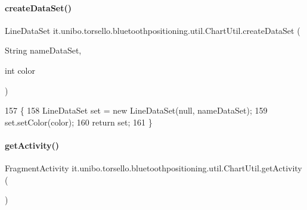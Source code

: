 \paragraph{\texorpdfstring{create\+Data\+Set()}{createDataSet()}\hspace{0.1cm}{\footnotesize\ttfamily [2/2]}}
{\footnotesize\ttfamily Line\+Data\+Set it.\+unibo.\+torsello.\+bluetoothpositioning.\+util.\+Chart\+Util.\+create\+Data\+Set (\begin{DoxyParamCaption}\item[{String}]{name\+Data\+Set,  }\item[{int}]{color }\end{DoxyParamCaption})\hspace{0.3cm}{\ttfamily [private]}}


\begin{DoxyCode}
157                                                                      \{
158         LineDataSet \textcolor{keyword}{set} = \textcolor{keyword}{new} LineDataSet(null, nameDataSet);
159         \textcolor{keyword}{set}.setColor(color);
160         \textcolor{keywordflow}{return} \textcolor{keyword}{set};
161     \}
\end{DoxyCode}
\hypertarget{classit_1_1unibo_1_1torsello_1_1bluetoothpositioning_1_1util_1_1ChartUtil_a59150a6d20b6d0ad2fcf8c1ba858d355_a59150a6d20b6d0ad2fcf8c1ba858d355}{}\label{classit_1_1unibo_1_1torsello_1_1bluetoothpositioning_1_1util_1_1ChartUtil_a59150a6d20b6d0ad2fcf8c1ba858d355_a59150a6d20b6d0ad2fcf8c1ba858d355} 
\paragraph{\texorpdfstring{get\+Activity()}{getActivity()}}
{\footnotesize\ttfamily Fragment\+Activity it.\+unibo.\+torsello.\+bluetoothpositioning.\+util.\+Chart\+Util.\+get\+Activity (\begin{DoxyParamCaption}{ }\end{DoxyParamCaption})}


